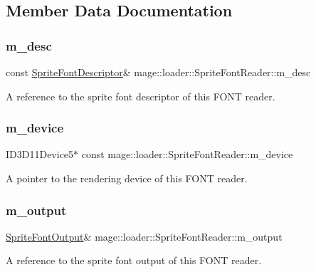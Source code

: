 \subsection{Member Data Documentation}
\hypertarget{classmage_1_1loader_1_1_sprite_font_reader_adf4502be72787c09c6d4b18566fcb906}{}\label{classmage_1_1loader_1_1_sprite_font_reader_adf4502be72787c09c6d4b18566fcb906} 
\subsubsection{\texorpdfstring{m\+\_\+desc}{m\_desc}}
{\footnotesize\ttfamily const \hyperlink{classmage_1_1_sprite_font_descriptor}{Sprite\+Font\+Descriptor}\& mage\+::loader\+::\+Sprite\+Font\+Reader\+::m\+\_\+desc\hspace{0.3cm}{\ttfamily [private]}}

A reference to the sprite font descriptor of this F\+O\+NT reader. \hypertarget{classmage_1_1loader_1_1_sprite_font_reader_ab4e714ca6e00846db7fb312d03c9ecc2}{}\label{classmage_1_1loader_1_1_sprite_font_reader_ab4e714ca6e00846db7fb312d03c9ecc2} 
\subsubsection{\texorpdfstring{m\+\_\+device}{m\_device}}
{\footnotesize\ttfamily I\+D3\+D11\+Device5$\ast$ const mage\+::loader\+::\+Sprite\+Font\+Reader\+::m\+\_\+device\hspace{0.3cm}{\ttfamily [private]}}

A pointer to the rendering device of this F\+O\+NT reader. \hypertarget{classmage_1_1loader_1_1_sprite_font_reader_a818ecabf97163ce3a9b81f67ebfd5799}{}\label{classmage_1_1loader_1_1_sprite_font_reader_a818ecabf97163ce3a9b81f67ebfd5799} 
\subsubsection{\texorpdfstring{m\+\_\+output}{m\_output}}
{\footnotesize\ttfamily \hyperlink{structmage_1_1_sprite_font_output}{Sprite\+Font\+Output}\& mage\+::loader\+::\+Sprite\+Font\+Reader\+::m\+\_\+output\hspace{0.3cm}{\ttfamily [private]}}

A reference to the sprite font output of this F\+O\+NT reader. 